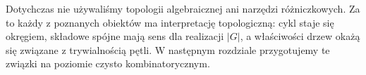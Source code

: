 \begin{uwaga}
Dotychczas nie używaliśmy topologii algebraicznej ani
narzędzi różniczkowych. Za to każdy z poznanych obiektów
ma interpretację topologiczną: cykl staje się okręgiem,
składowe spójne mają sens dla realizacji $|G|$, a
właściwości drzew okażą się związane z trywialnością
pętli. W następnym rozdziale przygotujemy te związki
na poziomie czysto kombinatorycznym.
\end{uwaga}


